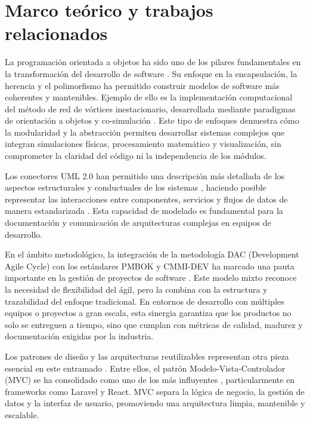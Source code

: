 \section{Marco teórico y trabajos relacionados}

La programación orientada a objetos ha sido uno de los pilares fundamentales en la transformación del desarrollo de software \cite{oop2023principles}. Su enfoque en la encapsulación, la herencia y el polimorfismo ha permitido construir modelos de software más coherentes y mantenibles. Ejemplo de ello es la implementación computacional del método de red de vórtices inestacionario, desarrollada mediante paradigmas de orientación a objetos y co-simulación \cite{oop2022simulation}. Este tipo de enfoques demuestra cómo la modularidad y la abstracción permiten desarrollar sistemas complejos que integran simulaciones físicas, procesamiento matemático y visualización, sin comprometer la claridad del código ni la independencia de los módulos.

Los conectores UML 2.0 han permitido una descripción más detallada de los aspectos estructurales y conductuales de los sistemas \cite{uml2020guide}, haciendo posible representar las interacciones entre componentes, servicios y flujos de datos de manera estandarizada \cite{uml2021agile}. Esta capacidad de modelado es fundamental para la documentación y comunicación de arquitecturas complejas en equipos de desarrollo.

En el ámbito metodológico, la integración de la metodología DAC (Development Agile Cycle) con los estándares PMBOK \cite{pmbok2017} y CMMI-DEV \cite{cmmi2018} ha marcado una pauta importante en la gestión de proyectos de software \cite{dac2020methodology}. Este modelo mixto reconoce la necesidad de flexibilidad del ágil, pero la combina con la estructura y trazabilidad del enfoque tradicional. En entornos de desarrollo con múltiples equipos o proyectos a gran escala, esta sinergia garantiza que los productos no solo se entreguen a tiempo, sino que cumplan con métricas de calidad, madurez y documentación exigidas por la industria.

Los patrones de diseño y las arquitecturas reutilizables representan otra pieza esencial en este entramado \cite{gamma1995patterns}. Entre ellos, el patrón Modelo-Vista-Controlador (MVC) se ha consolidado como uno de los más influyentes \cite{mvc2019analysis}, particularmente en frameworks como Laravel y React. MVC separa la lógica de negocio, la gestión de datos y la interfaz de usuario, promoviendo una arquitectura limpia, mantenible y escalable.


